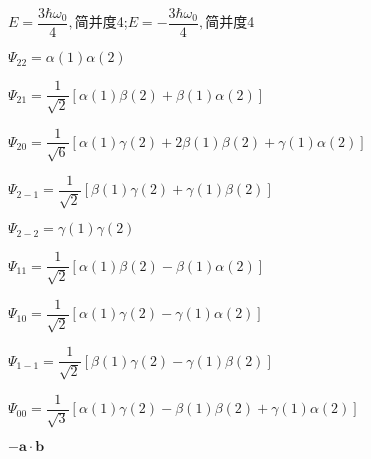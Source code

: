 		$ E=\dfrac{3\hbar\omega_{0}}{4}, $简并度4;\quad $E=-\dfrac{3\hbar\omega_{0}}{4},$简并度4

\answer $ \varPsi_{22}=\alpha(1)\alpha(2) $

		$ \varPsi_{21}=\dfrac{1}{\sqrt{2}}[\alpha(1)\beta(2)+\beta(1)\alpha(2)] $
		
		$ \varPsi_{20}=\dfrac{1}{\sqrt{6}}[\alpha(1)\gamma(2)+2\beta(1)\beta(2)+\gamma(1)\alpha(2)] $
		
		$ \varPsi_{2-1}=\dfrac{1}{\sqrt{2}}[\beta(1)\gamma(2)+\gamma(1)\beta(2)] $
		
		$ \varPsi_{2-2}=\gamma(1)\gamma(2) $
		
		$ \varPsi_{11}=\dfrac{1}{\sqrt{2}}[\alpha(1)\beta(2)-\beta(1)\alpha(2)] $
		
		$ \varPsi_{10}=\dfrac{1}{\sqrt{2}}[\alpha(1)\gamma(2)-\gamma(1)\alpha(2)] $
		
		$ \varPsi_{1-1}=\dfrac{1}{\sqrt{2}}[\beta(1)\gamma(2)-\gamma(1)\beta(2)] $
		
		$ \varPsi_{00}=\dfrac{1}{\sqrt{3}}[\alpha(1)\gamma(2)-\beta(1)\beta(2)+\gamma(1)\alpha(2)] $


	

\answer $ -\boldsymbol{a}\cdot\boldsymbol{b} $